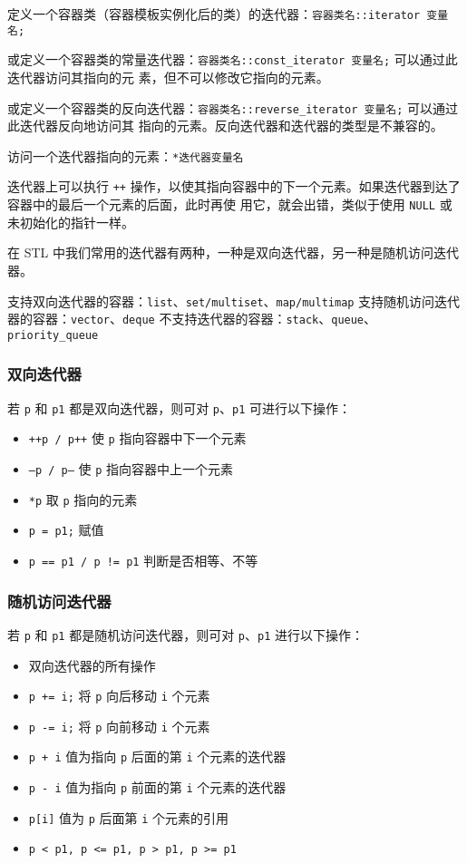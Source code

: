 \documentclass[UTF8]{ctexart}
\begin{document}
定义一个容器类（容器模板实例化后的类）的迭代器：\texttt{容器类名::iterator 变量名;}

或定义一个容器类的常量迭代器：\texttt{容器类名::const_iterator 变量名;} 可以通过此迭代器访问其指向的元
素，但不可以修改它指向的元素。

或定义一个容器类的反向迭代器：\texttt{容器类名::reverse_iterator 变量名;} 可以通过此迭代器反向地访问其
指向的元素。反向迭代器和迭代器的类型是不兼容的。

访问一个迭代器指向的元素：\texttt{*迭代器变量名}

迭代器上可以执行 \texttt{++} 操作，以使其指向容器中的下一个元素。如果迭代器到达了容器中的最后一个元素的后面，此时再使
用它，就会出错，类似于使用 \texttt{NULL} 或未初始化的指针一样。

在 STL 中我们常用的迭代器有两种，一种是双向迭代器，另一种是随机访问迭代器。

支持双向迭代器的容器：\texttt{list}、\texttt{set/multiset}、\texttt{map/multimap}
支持随机访问迭代器的容器：\texttt{vector}、\texttt{deque}
不支持迭代器的容器：\texttt{stack}、\texttt{queue}、\texttt{priority\_queue}

\subsubsection{双向迭代器}
若 \texttt{p} 和 \texttt{p1} 都是双向迭代器，则可对 \texttt{p}、\texttt{p1} 可进行以下操作：
\begin{itemize}
    \item \texttt{++p / p++} 使 \texttt{p} 指向容器中下一个元素
    \item \texttt{--p / p--} 使 \texttt{p} 指向容器中上一个元素
    \item \texttt{*p} 取 \texttt{p} 指向的元素
    \item \texttt{p = p1;} 赋值
    \item \texttt{p == p1 / p != p1} 判断是否相等、不等
\end{itemize}

\subsubsection{随机访问迭代器}
若 \texttt{p} 和 \texttt{p1} 都是随机访问迭代器，则可对 \texttt{p}、\texttt{p1} 进行以下操作：
\begin{itemize}
    \item 双向迭代器的所有操作
    \item \texttt{p += i;} 将 \texttt{p} 向后移动 \texttt{i} 个元素
    \item \texttt{p -= i;} 将 \texttt{p} 向前移动 \texttt{i} 个元素
    \item \texttt{p + i} 值为指向 \texttt{p} 后面的第 \texttt{i} 个元素的迭代器
    \item \texttt{p - i} 值为指向 \texttt{p} 前面的第 \texttt{i} 个元素的迭代器
    \item \texttt{p[i]} 值为 \texttt{p} 后面第 \texttt{i} 个元素的引用
    \item \texttt{p < p1, p <= p1, p > p1, p >= p1}
\end{itemize}
\end{document}
